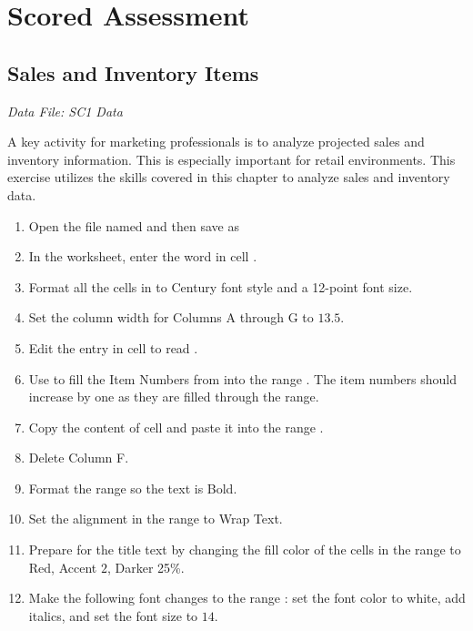 \section{Scored Assessment}

\subsection{Sales and Inventory Items}

\textit{Data File: SC1 Data}

A key activity for marketing professionals is to analyze projected sales and inventory information. This is especially important for retail environments. This exercise utilizes the skills covered in this chapter to analyze sales and inventory data.

\begin{enumerate}
	\item Open the file named  and then save as 
	\item In the  worksheet, enter the word  in cell .
	\item Format all the cells in  to Century font style and a 12-point font size.
	\item Set the column width for Columns A through G to $ 13.5 $.
	\item Edit the entry in cell  to read .
	\item Use  to fill the Item Numbers from  into the range . The item numbers should increase by one as they are filled through the range.
	\item Copy the content of cell  and paste it into the range .
	\item Delete Column F.
	\item Format the range  so the text is Bold.
	\item Set the alignment in the range  to Wrap Text.
	\item Prepare  for the title text by changing the fill color of the cells in the range  to Red, Accent $ 2 $, Darker 25\%.
	\item Make the following font changes to the range : set the font color to white, add italics, and set the font size to $ 14 $.

\end{enumerate}
